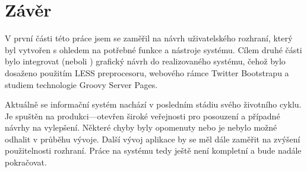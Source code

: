 \chapter{Závěr}

V první části této práce jsem se zaměřil na návrh uživatelského rozhraní, který byl vytvořen s ohledem na potřebné funkce a nástroje systému. Cílem druhé části bylo integrovat (neboli ) grafický návrh do realizovaného systému, čehož bylo dosaženo použitím LESS preprocesoru, webového rámce Twitter Bootstrapu a studiem technologie Groovy Server Pages.

Aktuálně se informační systém nachází v posledním stádiu svého životního cyklu. Je spuštěn na produkci---otevřen široké veřejnosti pro posouzení a případné návrhy na vylepšení. Některé chyby byly opomenuty nebo je nebylo možné odhalit v průběhu vývoje. Další vývoj aplikace by se měl dále zaměřit na zvýšení použitelnosti rozhraní. Práce na systému tedy ještě není kompletní a bude nadále pokračovat.
